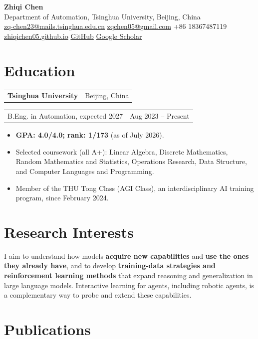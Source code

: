 \documentclass[11pt,letterpaper]{article}
\makeatletter
\newcommand{\headerrow}[2]{%
    \begin{tabular*}{\linewidth}{@{}l@{\extracolsep{\fill}}r@{}}
        #1 & #2 \\
    \end{tabular*}\par
}
\makeatother
\begin{document}
\begin{center}
    {\LARGE\textbf{Zhiqi Chen}}\\[3pt]
    Department of Automation, Tsinghua University, Beijing, China\\[3pt]
    {\small
    \href{mailto:zq-chen23@mails.tsinghua.edu.cn}{zq-chen23@mails.tsinghua.edu.cn}
    \quad\textbar\quad
    \href{mailto:zqchen05@gmail.com}{zqchen05@gmail.com}
    \quad\textbar\quad +86 18367487119\\[2pt]
    \href{https://zhiqichen05.github.io/}{zhiqichen05.github.io}
    \quad\textbar\quad
    \href{https://github.com/zhiqichen05}{GitHub}
    \quad\textbar\quad
    \href{https://scholar.google.com/citations?user=Nn2pmyQAAAAJ}{Google Scholar}}
\end{center}

\section*{Education}

\headerrow{\textbf{Tsinghua University}}{Beijing, China}
\headerrow{B.Eng. in Automation, expected 2027}{Aug 2023 -- Present}
\begin{itemize}
    \item \textbf{GPA: 4.0/4.0; rank: 1/173} (as of July 2026).
    \item Selected coursework (all A+): Linear Algebra, Discrete Mathematics, Random Mathematics and Statistics, Operations Research, Data Structure, and Computer Languages and Programming.
    \item Member of the THU Tong Class (AGI Class), an interdisciplinary AI training program, since February 2024.
\end{itemize}

\section*{Research Interests}

I aim to understand how models \textbf{acquire new capabilities} and \textbf{use the ones they already have}, and to develop \textbf{training-data strategies and reinforcement learning methods} that expand reasoning and generalization in large language models. Interactive learning for agents, including robotic agents, is a complementary way to probe and extend these capabilities.

\section*{Publications}
\end{document}
